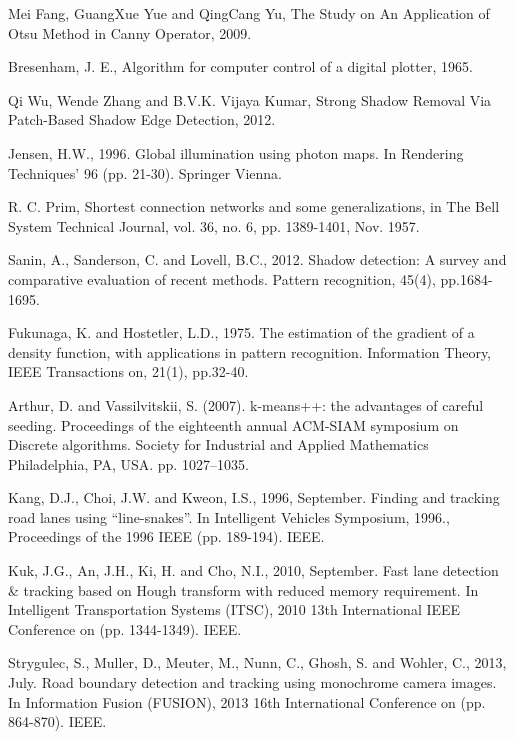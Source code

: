 \documentclass[oneside,english]{llncs}
\begin{document}
\begin{thebibliography}{1}
Mei Fang, GuangXue Yue and QingCang Yu, The Study
on An Application of Otsu Method in Canny Operator, 2009.

Bresenham, J. E., Algorithm for computer control of
a digital plotter, 1965.

Qi Wu, Wende Zhang and B.V.K. Vijaya Kumar, Strong
Shadow Removal Via Patch-Based Shadow Edge Detection, 2012.

Jensen, H.W., 1996. Global illumination using photon maps. In Rendering Techniques’ 96 (pp. 21-30). Springer Vienna.

R. C. Prim, \textquotedbl{}Shortest connection networks
and some generalizations,\textquotedbl{} in The Bell System Technical
Journal, vol. 36, no. 6, pp. 1389-1401, Nov. 1957.

Sanin, A., Sanderson, C. and Lovell, B.C., 2012. Shadow
detection: A survey and comparative evaluation of recent methods.
Pattern recognition, 45(4), pp.1684-1695.

Fukunaga, K. and Hostetler, L.D., 1975. The estimation
of the gradient of a density function, with applications in pattern
recognition. Information Theory, IEEE Transactions on, 21(1), pp.32-40.

Arthur, D. and Vassilvitskii, S. (2007). \textquotedbl{}k-means++:
the advantages of careful seeding\textquotedbl{}. Proceedings of the
eighteenth annual ACM-SIAM symposium on Discrete algorithms. Society
for Industrial and Applied Mathematics Philadelphia, PA, USA. pp.
1027–1035.

Kang, D.J., Choi, J.W. and Kweon, I.S., 1996, September. Finding and tracking road lanes using “line-snakes”. In Intelligent Vehicles Symposium, 1996., Proceedings of the 1996 IEEE (pp. 189-194). IEEE.

Kuk, J.G., An, J.H., Ki, H. and Cho, N.I., 2010, September. Fast lane detection \& tracking based on Hough transform with reduced memory requirement. In Intelligent Transportation Systems (ITSC), 2010 13th International IEEE Conference on (pp. 1344-1349). IEEE.

Strygulec, S., Muller, D., Meuter, M., Nunn, C., Ghosh, S. and Wohler, C., 2013, July. Road boundary detection and tracking using monochrome camera images. In Information Fusion (FUSION), 2013 16th International Conference on (pp. 864-870). IEEE.


\end{thebibliography}
\end{document}
